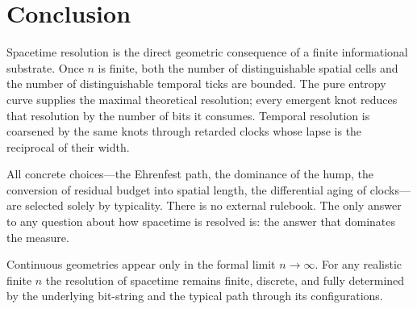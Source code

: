 \documentclass[11pt]{article}
\begin{document}
\section{Conclusion}

Spacetime resolution is the direct geometric consequence of a finite 
informational substrate. Once \(n\) is finite, both the number of 
distinguishable spatial cells and the number of distinguishable 
temporal ticks are bounded. The pure entropy curve supplies the maximal 
theoretical resolution; every emergent knot reduces that resolution by 
the number of bits it consumes. Temporal resolution is coarsened by the 
same knots through retarded clocks whose lapse is the reciprocal of 
their width.

All concrete choices---the Ehrenfest path, the dominance of the hump, 
the conversion of residual budget into spatial length, the differential 
aging of clocks---are selected solely by typicality. There is no 
external rulebook. The only answer to any question about how spacetime 
is resolved is: the answer that dominates the measure.

Continuous geometries appear only in the formal limit \(n\to\infty\). 
For any realistic finite \(n\) the resolution of spacetime remains 
finite, discrete, and fully determined by the underlying bit-string 
and the typical path through its configurations.

\printbibliography
\end{document}
